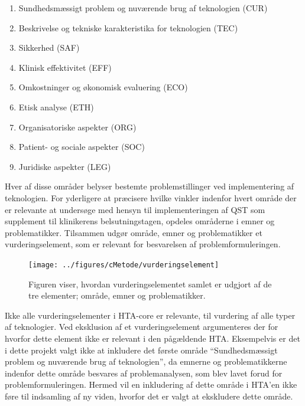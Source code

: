 \begin{enumerate}
	\item Sundhedsmæssigt problem og nuværende brug af teknologien (CUR)
	\item Beskrivelse og tekniske karakteristika for teknologien (TEC)
	\item Sikkerhed (SAF)
	\item Klinisk effektivitet (EFF)
	\item Omkostninger og økonomisk evaluering (ECO)
	\item Etisk analyse (ETH)
	\item Organisatoriske aspekter (ORG)
	\item Patient- og sociale aspekter (SOC)
	\item Juridiske aspekter (LEG)
\end{enumerate}

Hver af disse områder belyser bestemte problemstillinger ved implementering af teknologien. For yderligere at præcisere hvilke vinkler indenfor hvert område der er relevante at undersøge med hensyn til implementeringen af QST som supplement til klinikerens belsutningstagen, opdeles områderne i emner og problematikker. Tilsammen udgør område, emner og problematikker et vurderingselement, som er relevant for besvarelsen af problemformuleringen.

\begin{figure}[H] 
	\begin{center}
		\texttt{[image: ../figures/cMetode/vurderingselement]}
	\end{center}
	\caption{Figuren viser, hvordan vurderingselementet samlet er udgjort af de tre elementer; område, emner og problematikker.} 
	\label{fig:vurderingselement} 
\end{figure} \vspace{-.50cm}

Ikke alle vurderingselementer i HTA-core er relevante, til vurdering af alle typer af teknologier. Ved eksklusion  af et vurderingselement argumenteres der for hvorfor dette element ikke er relevant i den pågældende HTA. \citep{HTAcore} Eksempelvis er det i dette projekt valgt ikke at inkludere det første område “Sundhedsmæssigt problem og nuværende brug af teknologien”, da emnerne og problematikkerne indenfor dette område besvares af problemanalysen, som blev lavet forud for problemformuleringen. Hermed vil en inkludering af dette område i HTA’en ikke føre til indsamling af ny viden, hvorfor det er valgt at ekskludere dette område. 

